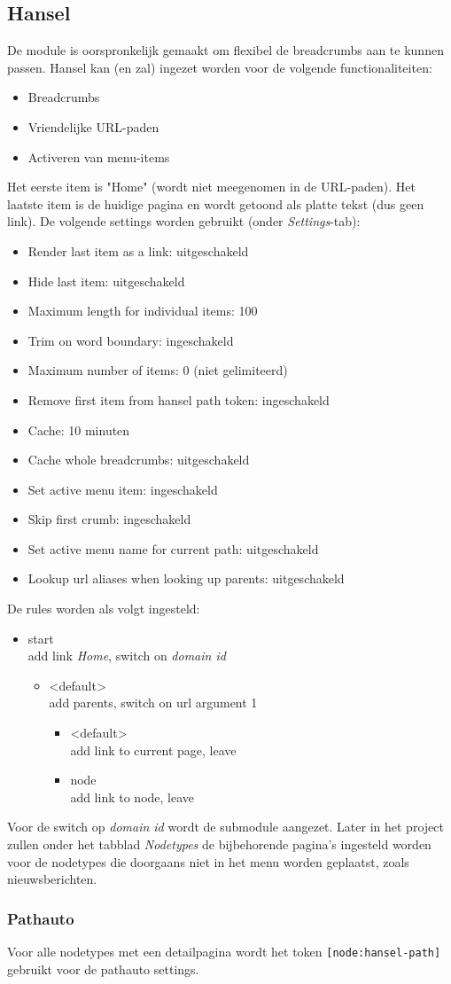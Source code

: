 \subsection{Hansel}

De module  is oorspronkelijk gemaakt om flexibel de breadcrumbs aan te kunnen passen. Hansel kan (en zal) ingezet worden voor de volgende functionaliteiten:
\begin{itemize}
\item Breadcrumbs
\item Vriendelijke URL-paden
\item Activeren van menu-items
\end{itemize}
Het eerste item is "Home" (wordt niet meegenomen in de URL-paden). Het laatste item is de huidige pagina en wordt getoond als platte tekst (dus geen link). De volgende settings worden gebruikt (onder \emph{Settings}-tab):
\begin{itemize}
\item Render last item as a link: uitgeschakeld
\item Hide last item: uitgeschakeld
\item Maximum length for individual items: 100
\item Trim on word boundary: ingeschakeld
\item Maximum number of items: 0 (niet gelimiteerd)
\item Remove first item from hansel path token: ingeschakeld
\item Cache: 10 minuten
\item Cache whole breadcrumbs: uitgeschakeld
\item Set active menu item: ingeschakeld
\item Skip first crumb: ingeschakeld
\item Set active menu name for current path: uitgeschakeld
\item Lookup url aliases when looking up parents: uitgeschakeld
\end{itemize}
De rules worden als volgt ingesteld:
\begin{itemize}
\item start \\ add link \emph{Home}, switch on \emph{domain id}
\begin{itemize}
\item \textless default\textgreater \\  add parents, switch on url argument 1
\begin{itemize}
\item \textless default\textgreater \\ add link to current page, leave
\item node \\ add link to node, leave
\end{itemize}
\end{itemize}
\end{itemize}
Voor de switch op \emph{domain id} wordt de submodule  aangezet.
Later in het project zullen onder het tabblad \emph{Nodetypes} de bijbehorende pagina's ingesteld worden voor de nodetypes die doorgaans niet in het menu worden geplaatst, zoals nieuwsberichten.

\subsubsection{Pathauto}
Voor alle nodetypes met een detailpagina wordt het token \texttt{[node:hansel-path]} gebruikt voor de pathauto settings.

